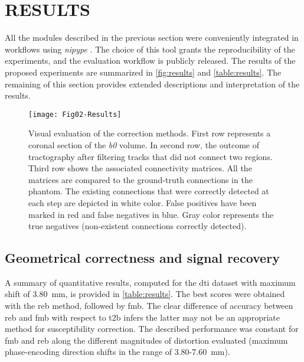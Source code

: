 \section{RESULTS}
\label{sec:results}

All the modules described in the previous section were
conveniently integrated in workflows using \emph{nipype}
\cite{gorgolewski_nipype:_2011}. The choice of this tool
grants the reproducibility of the experiments,
and the evaluation workflow is publicly released.
The results of the proposed experiments are summarized
in \autoref{fig:results} and \autoref{table:results}.
The remaining of this section provides extended descriptions
and interpretation of the results.

\begin{figure*}[tpb]
   \centering
   \texttt{[image: Fig02-Results]}
   \caption{Visual evaluation of the correction methods.
   First row represents a coronal section of the \textit{b0} volume. 
   In second row, the outcome of tractography after filtering tracks
   that did not connect two regions.
   Third row shows the associated connectivity matrices. All the matrices
   are compared to the ground-truth connections in the phantom. The existing
   connections that were correctly detected at each step are depicted in white
   color. False positives have been marked in red and false negatives in blue.
   Gray color represents the true negatives (non-existent connections correctly detected).}
   \label{fig:results}
\end{figure*}


\subsection{Geometrical correctness and signal recovery}

A summary of quantitative results, computed for the \gls*{dti} 
dataset with maximum shift of 3.80~mm,
is provided in \autoref{table:results}.
The best scores were obtained with the \gls*{reb} 
method, followed by \gls*{fmb}. 
The clear difference of accuracy between \gls*{reb} and \gls*{fmb}
with respect to \gls*{t2b} infers the latter may not be
an appropriate method for susceptibility correction. 
The described performance was constant for \gls*{fmb} 
and \gls*{reb} along the different magnitudes of 
distortion evaluated (maximum phase-encoding direction 
shifts in the range of 3.80-7.60~mm).



